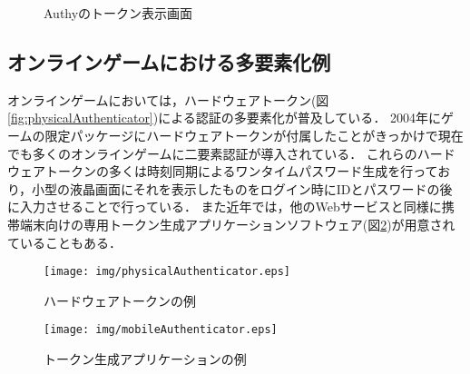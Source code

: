 \begin{figure}[ht]
  \begin{center}
  \end{center}
  \caption{Authyのトークン表示画面}
  \label{fig:authyiPhone}
\end{figure}

\subsection{オンラインゲームにおける多要素化例}
オンラインゲームにおいては，ハードウェアトークン(図\ref{fig:physicalAuthenticator})による認証の多要素化が普及している\cite{DBLP:journals/corr/CristofaroDFN13}．
2004年にゲームの限定パッケージにハードウェアトークンが付属した\cite{Yamane:2011:SOG:2021672.2021743}ことがきっかけで現在でも多くのオンラインゲームに二要素認証が導入されている．
これらのハードウェアトークンの多くは時刻同期によるワンタイムパスワード生成を行っており，小型の液晶画面にそれを表示したものをログイン時にIDとパスワードの後に入力させることで行っている．
また近年では，他のWebサービスと同様に携帯端末向けの専用トークン生成アプリケーションソフトウェア(図\ref{fig:mobileAuthenticator})が用意されていることもある．

\begin{figure}[ht]
  \begin{minipage}{0.5\hsize}
    \begin{center}
      \texttt{[image: img/physicalAuthenticator.eps]}
    \end{center}
    \caption{ハードウェアトークンの例}
    \label{fig:physicalAuthenticator}
  \end{minipage}
  \begin{minipage}{0.5\hsize}
    \begin{center}
      \texttt{[image: img/mobileAuthenticator.eps]}
    \end{center}
    \caption{トークン生成アプリケーションの例}
    \label{fig:mobileAuthenticator}
  \end{minipage}
\end{figure}


\newpage
